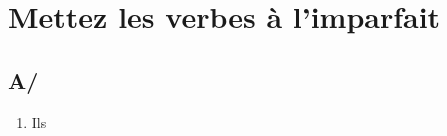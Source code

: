 \section{Mettez les verbes à l'imparfait}

\subsection{A/}

\begin{enumerate}
    \item Ils
\end{enumerate}